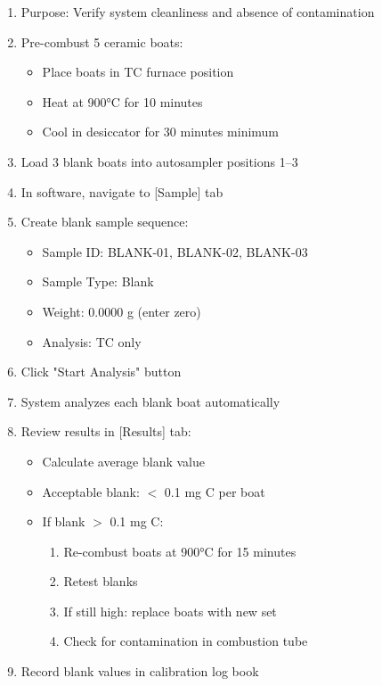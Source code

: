 \documentclass[11pt,a4paper]{article}\usepackage[]{graphicx}\usepackage[]{xcolor}
\begin{document}
\begin{enumerate}[noitemsep]
    \item Purpose: Verify system cleanliness and absence of contamination
    \item Pre-combust 5 ceramic boats:
    \begin{itemize}
        \item Place boats in TC furnace position
        \item Heat at 900°C for 10 minutes
        \item Cool in desiccator for 30 minutes minimum
    \end{itemize}
    \item Load 3 blank boats into autosampler positions 1--3
    \item In software, navigate to [Sample] tab
    \item Create blank sample sequence:
    \begin{itemize}
        \item Sample ID: BLANK-01, BLANK-02, BLANK-03
        \item Sample Type: Blank
        \item Weight: 0.0000 g (enter zero)
        \item Analysis: TC only
    \end{itemize}
    \item Click "Start Analysis" button
    \item System analyzes each blank boat automatically
    \item Review results in [Results] tab:
    \begin{itemize}
        \item Calculate average blank value
        \item Acceptable blank: $<$ 0.1 mg C per boat
        \item If blank $>$ 0.1 mg C:
        \begin{enumerate}
            \item Re-combust boats at 900°C for 15 minutes
            \item Retest blanks
            \item If still high: replace boats with new set
            \item Check for contamination in combustion tube
        \end{enumerate}
    \end{itemize}
    \item Record blank values in calibration log book
\end{enumerate}
\end{document}
